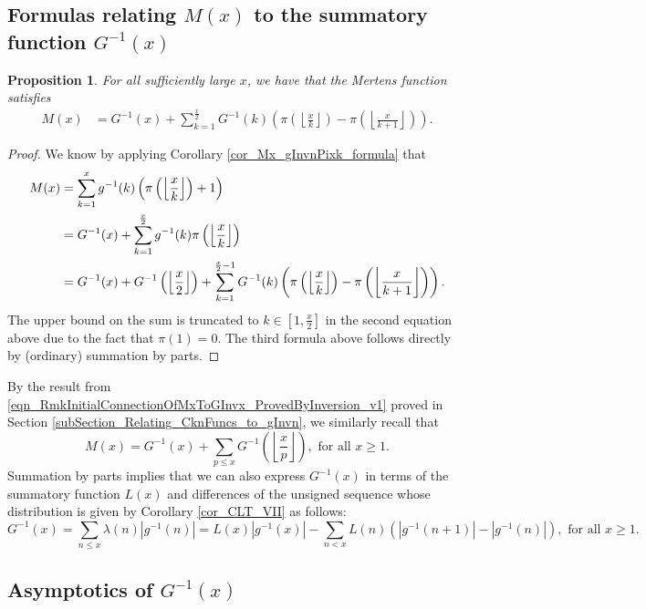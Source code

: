 \documentclass[11pt,reqno,a4letter]{article}
\numberwithin{figure}{section}
\numberwithin{table}{section}
\newcommand{\Floor}[2]{\ensuremath{\left\lfloor \frac{#1}{#2} \right\rfloor}}
\theoremstyle{plain}
\newtheorem{prop}[theorem]{Proposition}
\numberwithin{theorem}{section}
\theoremstyle{definition}
\begin{document}
\subsection{Formulas relating $M(x)$ to the summatory function $G^{-1}(x)$} 

\begin{prop} 
\label{prop_Mx_SBP_IntegralFormula} 
For all sufficiently large $x$, we have that the Mertens function satisfies 
\begin{align} 
\label{eqn_pf_tag_v2-restated_v2} 
M(x) & = G^{-1}(x) + 
     \sum_{k=1}^{\frac{x}{2}} G^{-1}(k) \left(
     \pi\left(\Floor{x}{k}\right) - \pi\left(\Floor{x}{k+1}\right) 
     \right). 
\end{align} 
\end{prop} 
\begin{proof} 
We know by applying Corollary \ref{cor_Mx_gInvnPixk_formula} that 
\begin{align} 
\notag
M(x) & = \sum_{k=1}^{x} g^{-1}(k) \left(\pi\left(\Floor{x}{k}\right)+1\right) \\ 
\notag 
     & = G^{-1}(x) + \sum_{k=1}^{\frac{x}{2}} g^{-1}(k) \pi\left(\Floor{x}{k}\right) \\ 
\notag 
     & = G^{-1}(x) + G^{-1}\left(\Floor{x}{2}\right) + 
     \sum_{k=1}^{\frac{x}{2}-1} G^{-1}(k) \left( 
     \pi\left(\Floor{x}{k}\right) - \pi\left(\Floor{x}{k+1}\right) 
     \right).
\end{align} 
The upper bound on the sum is truncated to $k \in \left[1, \frac{x}{2}\right]$ in the second equation 
above due to the fact that $\pi(1) = 0$. 
The third formula above follows directly by (ordinary) summation by parts. 
\end{proof} 

By the result from \eqref{eqn_RmkInitialConnectionOfMxToGInvx_ProvedByInversion_v1} 
proved in Section \ref{subSection_Relating_CknFuncs_to_gInvn}, 
we similarly recall that 
\[
M(x) = G^{-1}(x) + \sum_{p \leq x} G^{-1}\left(\Floor{x}{p}\right), 
     \text{ for all } x \geq 1. 
\]
Summation by parts implies that we can also express $G^{-1}(x)$ in terms 
of the summatory function $L(x)$ and differences of the unsigned sequence 
whose distribution is given by 
Corollary \ref{cor_CLT_VII} as follows: 
\[
G^{-1}(x) 
     = \sum_{n \leq x} \lambda(n) |g^{-1}(n)| 
     = L(x)|g^{-1}(x)| - \sum_{n < x} 
     L(n) \left(|g^{-1}(n+1)| - |g^{-1}(n)|\right), 
     \text{ for all } x \geq 1. 
\]

\subsection{Asymptotics of $G^{-1}(x)$} 
\label{subSection_AsymptoticsOfGinvx} 
\end{document}
